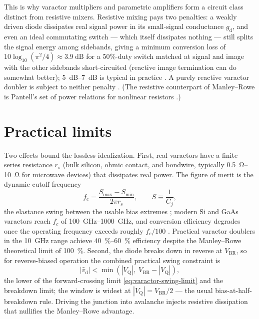 \documentclass[12pt]{article}
\newcommand{\VQ}{V_{\mathrm{Q}}}
\newcommand{\vhd}{\hat{v}_{\mathrm{d}}}
\newcommand{\gd}{g_{\mathrm{d}}}
\begin{document}
This is why varactor multipliers and parametric amplifiers form a circuit class distinct from resistive mixers. Resistive mixing pays two penalties: a weakly driven diode dissipates real signal power in its small-signal conductance $\gd$, and even an ideal commutating switch --- which itself dissipates nothing --- still splits the signal energy among sidebands, giving a minimum conversion loss of $10\log_{10}(\pi^2/4) \approx \SI{3.9}{\deci\bel}$ for a 50\%-duty switch matched at signal and image with the other sidebands short-circuited (reactive image termination can do somewhat better); \SIrange{5}{7}{\deci\bel} is typical in practice \cite{maas}. A purely reactive varactor doubler is subject to neither penalty \cite{penfieldrafuse}. (The resistive counterpart of Manley--Rowe is Pantell's set of power relations for nonlinear resistors \cite{pantell}.)

\section*{Practical limits}

Two effects bound the lossless idealization. First, real varactors have a finite series resistance $r_s$ (bulk silicon, ohmic contact, and bondwire, typically \SIrange{0.5}{10}{\ohm} for microwave devices) that dissipates real power. The figure of merit is the dynamic cutoff frequency
\begin{equation}
f_c = \frac{S_{\max} - S_{\min}}{2\pi r_s}, \qquad S \equiv \frac{1}{C_j},
\end{equation}
the elastance swing between the usable bias extremes \cite{penfieldrafuse}; modern Si and GaAs varactors reach $f_c$ of \SIrange{100}{1000}{\giga\hertz}, and conversion efficiency degrades once the operating frequency exceeds roughly $f_c/100$ \cite{penfieldrafuse,pozar}. Practical varactor doublers in the \SI{10}{\giga\hertz} range achieve \SIrange{40}{60}{\percent} efficiency despite the Manley--Rowe theoretical limit of \SI{100}{\percent}. Second, the diode breaks down in reverse at $V_\mathrm{BR}$, so for reverse-biased operation the combined practical swing constraint is
\begin{equation}
|\vhd| < \min\!\left(|\VQ|,\; V_\mathrm{BR} - |\VQ|\right),
\label{eq:swing-combined}
\end{equation}
the lower of the forward-crossing limit \eqref{eq:varactor-swing-limit} and the breakdown limit; the window is widest at $|\VQ| = V_\mathrm{BR}/2$ --- the usual bias-at-half-breakdown rule. Driving the junction into avalanche injects resistive dissipation that nullifies the Manley--Rowe advantage.
\end{document}
